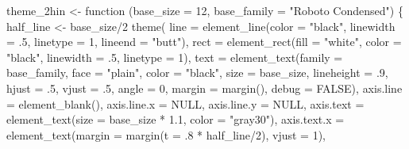 \documentclass[
  letterpaper,
]{scrbook}
\newenvironment{Shaded}{\begin{snugshade}}{\end{snugshade}}
\newcommand{\AttributeTok}[1]{\textcolor[rgb]{0.40,0.45,0.13}{#1}}
\newcommand{\ConstantTok}[1]{\textcolor[rgb]{0.56,0.35,0.01}{#1}}
\newcommand{\ControlFlowTok}[1]{\textcolor[rgb]{0.00,0.23,0.31}{#1}}
\newcommand{\DecValTok}[1]{\textcolor[rgb]{0.68,0.00,0.00}{#1}}
\newcommand{\FloatTok}[1]{\textcolor[rgb]{0.68,0.00,0.00}{#1}}
\newcommand{\FunctionTok}[1]{\textcolor[rgb]{0.28,0.35,0.67}{#1}}
\newcommand{\NormalTok}[1]{\textcolor[rgb]{0.00,0.23,0.31}{#1}}
\newcommand{\OtherTok}[1]{\textcolor[rgb]{0.00,0.23,0.31}{#1}}
\newcommand{\SpecialCharTok}[1]{\textcolor[rgb]{0.37,0.37,0.37}{#1}}
\newcommand{\StringTok}[1]{\textcolor[rgb]{0.13,0.47,0.30}{#1}}
\begin{document}
\begin{Shaded}
\begin{Highlighting}[]
\NormalTok{theme\_2hin }\OtherTok{\textless{}{-}} \ControlFlowTok{function}\NormalTok{ (}\AttributeTok{base\_size =} \DecValTok{12}\NormalTok{, }\AttributeTok{base\_family =} \StringTok{"Roboto Condensed"}\NormalTok{) \{}
\NormalTok{  half\_line }\OtherTok{\textless{}{-}}\NormalTok{ base\_size}\SpecialCharTok{/}\DecValTok{2}
  \FunctionTok{theme}\NormalTok{(}
    \AttributeTok{line =} \FunctionTok{element\_line}\NormalTok{(}\AttributeTok{color =} \StringTok{"black"}\NormalTok{, }\AttributeTok{linewidth =}\NormalTok{ .}\DecValTok{5}\NormalTok{,}
                        \AttributeTok{linetype =} \DecValTok{1}\NormalTok{, }\AttributeTok{lineend =} \StringTok{"butt"}\NormalTok{),}
    \AttributeTok{rect =} \FunctionTok{element\_rect}\NormalTok{(}\AttributeTok{fill =} \StringTok{"white"}\NormalTok{, }\AttributeTok{color =} \StringTok{"black"}\NormalTok{,}
                        \AttributeTok{linewidth =}\NormalTok{ .}\DecValTok{5}\NormalTok{, }\AttributeTok{linetype =} \DecValTok{1}\NormalTok{),}
    \AttributeTok{text =} \FunctionTok{element\_text}\NormalTok{(}\AttributeTok{family =}\NormalTok{ base\_family, }\AttributeTok{face =} \StringTok{"plain"}\NormalTok{,}
                        \AttributeTok{color =} \StringTok{"black"}\NormalTok{, }\AttributeTok{size =}\NormalTok{ base\_size,}
                        \AttributeTok{lineheight =}\NormalTok{ .}\DecValTok{9}\NormalTok{, }\AttributeTok{hjust =}\NormalTok{ .}\DecValTok{5}\NormalTok{, }\AttributeTok{vjust =}\NormalTok{ .}\DecValTok{5}\NormalTok{,}
                        \AttributeTok{angle =} \DecValTok{0}\NormalTok{, }\AttributeTok{margin =} \FunctionTok{margin}\NormalTok{(), }\AttributeTok{debug =} \ConstantTok{FALSE}\NormalTok{),}
    \AttributeTok{axis.line =} \FunctionTok{element\_blank}\NormalTok{(),}
    \AttributeTok{axis.line.x =} \ConstantTok{NULL}\NormalTok{,}
    \AttributeTok{axis.line.y =} \ConstantTok{NULL}\NormalTok{,}
    \AttributeTok{axis.text =} \FunctionTok{element\_text}\NormalTok{(}\AttributeTok{size =}\NormalTok{ base\_size }\SpecialCharTok{*} \FloatTok{1.1}\NormalTok{, }\AttributeTok{color =} \StringTok{"gray30"}\NormalTok{),}
    \AttributeTok{axis.text.x =} \FunctionTok{element\_text}\NormalTok{(}\AttributeTok{margin =} \FunctionTok{margin}\NormalTok{(}\AttributeTok{t =}\NormalTok{ .}\DecValTok{8} \SpecialCharTok{*}\NormalTok{ half\_line}\SpecialCharTok{/}\DecValTok{2}\NormalTok{),}
                               \AttributeTok{vjust =} \DecValTok{1}\NormalTok{),}

\end{Highlighting}
\end{Shaded}
\end{document}
